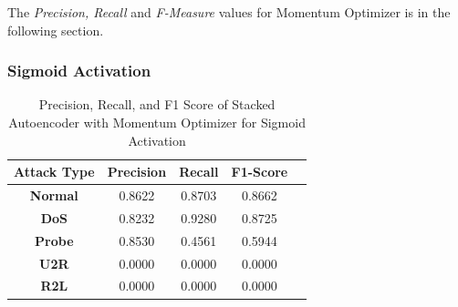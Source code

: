 \documentclass[12pt, a4paper]{report}
\begin{document}
The \textit{Precision, Recall} and \textit{F-Measure} values for Momentum Optimizer is in the following section.\\ \par
\clearpage
\subsubsection{Sigmoid Activation}
\begin{table}[ht]
\centering
\captionsetup{justification=centering,margin=2cm}
\begin{tabular}{|c|c|c|c|c|}
\hline
\multicolumn{1}{|c|}{\textbf{Attack Type}} & \multicolumn{1}{c|}{\textbf{Precision}} & \multicolumn{1}{c|}{\textbf{Recall}} & \multicolumn{1}{c|}{\textbf{F1-Score}} \\ \hline
\textbf{Normal}        & 0.8622                                   & 0.8703                                & 0.8662                                                                  \\ \hline
\textbf{DoS}           & 0.8232                                  & 0.9280                                &  0.8725                                                                    \\ \hline
\textbf{Probe}         & 0.8530                                  & 0.4561                                & 0.5944                                                                  \\ \hline
\textbf{U2R}           & 0.0000                                    & 0.0000                                & 0.0000                                                                   \\ \hline
\textbf{R2L}           & 0.0000                                      & 0.0000                                   & 0.0000                                                            \\ \hline         \end{tabular}
\caption{Precision, Recall, and F1 Score of Stacked Autoencoder with Momentum Optimizer for Sigmoid Activation}
\label{prf1_mom_sigmoid_auto}
\end{table}
\end{document}
